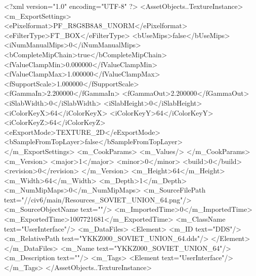 <?xml version="1.0" encoding="UTF-8" ?>
<AssetObjects..TextureInstance>
	<m_ExportSettings>
		<ePixelformat>PF_R8G8B8A8_UNORM</ePixelformat>
		<eFilterType>FT_BOX</eFilterType>
		<bUseMips>false</bUseMips>
		<iNumManualMips>0</iNumManualMips>
		<bCompleteMipChain>true</bCompleteMipChain>
		<fValueClampMin>0.000000</fValueClampMin>
		<fValueClampMax>1.000000</fValueClampMax>
		<fSupportScale>1.000000</fSupportScale>
		<fGammaIn>2.200000</fGammaIn>
		<fGammaOut>2.200000</fGammaOut>
		<iSlabWidth>0</iSlabWidth>
		<iSlabHeight>0</iSlabHeight>
		<iColorKeyX>64</iColorKeyX>
		<iColorKeyY>64</iColorKeyY>
		<iColorKeyZ>64</iColorKeyZ>
		<eExportMode>TEXTURE_2D</eExportMode>
		<bSampleFromTopLayer>false</bSampleFromTopLayer>
	</m_ExportSettings>
	<m_CookParams>
		<m_Values/>
	</m_CookParams>
	<m_Version>
		<major>1</major>
		<minor>0</minor>
		<build>0</build>
		<revision>0</revision>
	</m_Version>
	<m_Height>64</m_Height>
	<m_Width>64</m_Width>
	<m_Depth>1</m_Depth>
	<m_NumMipMaps>0</m_NumMipMaps>
	<m_SourceFilePath text="//civ6/main/Resources_SOVIET_UNION_64.png"/>
	<m_SourceObjectName text=""/>
	<m_ImportedTime>0</m_ImportedTime>
	<m_ExportedTime>1007721681</m_ExportedTime>
	<m_ClassName text="UserInterface"/>
	<m_DataFiles>
		<Element>
			<m_ID text="DDS"/>
			<m_RelativePath text="YKKZ000_SOVIET_UNION_64.dds"/>
		</Element>
	</m_DataFiles>
	<m_Name text="YKKZ000_SOVIET_UNION_64"/>
	<m_Description text=""/>
	<m_Tags>
		<Element text="UserInterface"/>
	</m_Tags>
</AssetObjects..TextureInstance>

